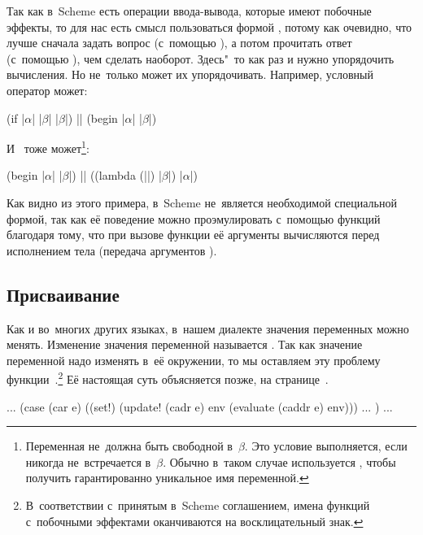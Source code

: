 Так как в~Scheme есть операции ввода-вывода, которые имеют побочные эффекты, то
для нас есть смысл пользоваться формой , потому как очевидно, что
лучше сначала задать вопрос (с~помощью ), а потом прочитать ответ
(с~помощью ), чем сделать наоборот. Здесь"~то как раз и нужно
упорядочить вычисления. Но не~только  может их упорядочивать.
Например, условный оператор может:

\begin{code:lisp}
(if |$\alpha$| |$\beta$| |$\beta$|) |\eq| (begin |$\alpha$| |$\beta$|)
\end{code:lisp}

\noindent
И~ тоже может\footnote{Переменная  не~должна быть свободной
в~$\beta$. Это условие выполняется, если  никогда не~встречается
в~$\beta$. Обычно в~таком случае используется , чтобы получить
гарантированно уникальное имя переменной. }:

\begin{code:lisp}
(begin |$\alpha$| |$\beta$|) |\eq| ((lambda (||) |$\beta$|) |$\alpha$|)
\end{code:lisp}

Как видно из этого примера, в~Scheme  не~является необходимой
специальной формой, так как её поведение можно проэмулировать с~помощью
функций благодаря тому, что при вызове функции её аргументы вычисляются перед
исполнением тела (передача аргументов ).


\subsection{Присваивание}\label{basics/evaluating-forms/ssect:assignment}

Как и во~многих других языках, в~нашем диалекте значения переменных можно
менять. Изменение значения переменной называется . Так как
значение переменной надо изменять в~её окружении, то мы оставляем эту проблему
функции~.\footnote*{В~соответствии с~принятым в~Scheme соглашением,
имена функций с~побочными эффектами оканчиваются на восклицательный знак.} Её
настоящая суть объясняется позже, на
странице~\pageref{assignment/implementation/ssect:environment}.

\begin{code:lisp}
... (case (car e)
      ((set!) (update! (cadr e) env
                       (evaluate (caddr e) env))) ... ) ...
\end{code:lisp}

